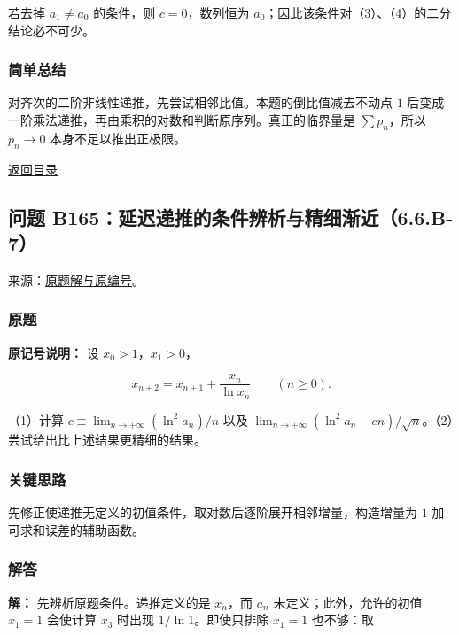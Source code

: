 \documentclass[11pt,a4paper]{article}
\begin{document}
若去掉 \(a_1\ne a_0\) 的条件，则 \(c=0\)，数列恒为
\(a_0\)；因此该条件对（3）、（4）的二分结论必不可少。

\subsubsection{简单总结}\label{ux7b80ux5355ux603bux7ed3-8}

对齐次的二阶非线性递推，先尝试相邻比值。本题的倒比值减去不动点 \(1\)
后变成一阶乘法递推，再由乘积的对数和判断原序列。真正的临界量是
\(\sum p_n\)，所以 \(p_n\to0\) 本身不足以推出正极限。

\noindent\hyperref[contents]{返回目录}

\subsection{问题
B165：延迟递推的条件辨析与精细渐近（6.6.B-7）}\label{ux95eeux9898-b165ux5ef6ux8fdfux9012ux63a8ux7684ux6761ux4ef6ux8fa8ux6790ux4e0eux7cbeux7ec6ux6e10ux8fd16.6.b-7}

来源：\href{https://zj139.github.io/math-notes/problems/a0a262f9a6114b75980fa4f7/\#问题-b165}{原题解与原编号}。

\subsubsection{原题}\label{ux539fux9898-9}

\textbf{原记号说明：} 设 \(x_0>1\)，\(x_1>0\)，

\[
x_{n+2}=x_{n+1}+\frac{x_n}{\ln x_n}\qquad(n\ge0).
\]

（1）计算 \(c\equiv\lim_{n\to+\infty}(\ln^2a_n)/n\) 以及
\(\lim_{n\to+\infty}(\ln^2a_n-cn)/\sqrt n\)。（2）尝试给出比上述结果更精细的结果。

\subsubsection{关键思路}\label{ux5173ux952eux601dux8def-9}

先修正使递推无定义的初值条件，取对数后逐阶展开相邻增量，构造增量为 \(1\)
加可求和误差的辅助函数。

\subsubsection{解答}\label{ux89e3ux7b54-9}

\textbf{解：} 先辨析原题条件。递推定义的是 \(x_n\)，而 \(a_n\)
未定义；此外，允许的初值 \(x_1=1\) 会使计算 \(x_3\) 时出现
\(1/\ln1\)。即使只排除 \(x_1=1\) 也不够：取
\end{document}
